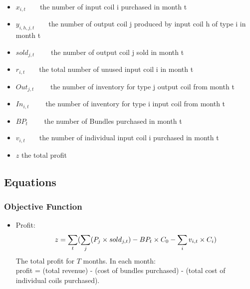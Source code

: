 \documentclass{article}[12pt]
\begin{document}
\begin{itemize}
\item $x_{i,t} \qquad$the number of input coil i purchased in month t \\

\item $y_{i,h,j,t} \qquad$the number of output coil j produced by input coil h of type i in month t \\

\item $sold_{j,t} \qquad$ the number of output coil j sold in month t \\

\item $r_{i,t} \qquad$the total number of unused input coil i in month t \\ 

\item $Out_{j,t} \qquad$ the number of inventory for type j output coil from month t \\

\item $In_{i,t} \qquad$	the number of inventory for type i input coil from month t \\

\item $BP_{t} \qquad$	the number of Bundles purchased in month t \\

\item $v_{i,t} \qquad$the number of individual input coil i purchased in month t \\

\item $z$	the total profit \\

\end{itemize}

\subsection{Equations}

\subsubsection{Objective Function}

\begin{itemize}

\item Profit: 
\begin{displaymath}
z = \sum_{t} (\sum_{j} (P_{j}\times sold_{j,t}) - BP_{t}\times C_{0} - \sum_{i} v_{i,t}\times C_{i} )\\
\end{displaymath}
The total profit for $T$ months. In each month: \\ 
profit = (total revenue) - (cost of bundles purchased) - (total cost of individual coils purchased). \\

\end{itemize}
\end{document}
